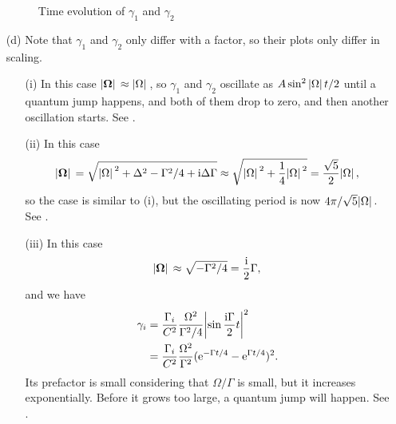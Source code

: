 \documentclass[hyperref, a4paper]{article}
\newcommand*{\ii}{\mathrm{i}}
\newcommand*{\ee}{\mathrm{e}}
\begin{document}
\begin{itemize}
\begin{figure}
    \centering
    \begin{subfigure}{0.45\textwidth}
        \centering
        
        \label{fig:gamma-1}
    \end{subfigure}
    \quad
    \begin{subfigure}{0.45\textwidth}
        \centering
        
        \label{fig:gamma-2}
    \end{subfigure}
    \begin{subfigure}{0.45\textwidth}
        \centering
        
        \label{fig:gamma-3}
    \end{subfigure}
    \caption{Time evolution of $\gamma_1$ and $\gamma_2$}
    \label{fig:gammas}
\end{figure}

\item[(d)] Note that $\gamma_1$ and $\gamma_2$ only differ with a factor, so their plots only differ in scaling.
\begin{itemize}
    \item[(i)] In this case $\abs*{\vb*{\Omega}} \approx \abs*{\Omega}$, so $\gamma_1$ and $\gamma_2$ oscillate as
    $A \sin^2 \abs*{\Omega} t / 2$ until a quantum jump happens, and both of them drop to zero, and then another 
    oscillation starts. See .
    \item[(ii)] In this case 
    \[
        \abs*{\vb*{\Omega}} = \sqrt{\abs*{\Omega}^2 + \Delta^2 - \Gamma^2 / 4 + \ii \Delta \Gamma}
        \approx \sqrt{\abs*{\Omega}^2 + \frac{1}{4} \abs*{\Omega}^2} = \frac{\sqrt{5}}{2} \abs*{\Omega},
    \] 
    so the case is similar to (i), but the oscillating period is now $4 \pi / \sqrt{5} \abs*{\Omega}$. See .
    \item[(iii)] In this case 
    \[
        \abs*{\vb*{\Omega}} \approx \sqrt{- \Gamma^2 / 4} = \frac{\ii}{2} \Gamma,
    \] 
    and we have 
    \[
        \begin{aligned}
            \gamma_i &= \frac{\Gamma_i}{{C}^2} \frac{\Omega^2}{\Gamma^2 / 4} \abs{\sin \frac{\ii \Gamma}{2} t}^2 \\
            &= \frac{\Gamma_i}{{C}^2} \frac{ \Omega^2}{\Gamma^2 } (\ee^{- \Gamma t / 4} - \ee^{\Gamma t / 4})^2.
        \end{aligned}
    \]
    Its prefactor is small considering that $\Omega / \Gamma$ is small, but it increases exponentially. Before it 
    grows too large, a quantum jump will happen. See .
\end{itemize}

\end{itemize}
\end{document}
